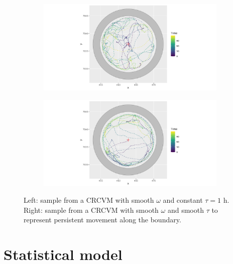 \documentclass[11pt]{article}
\newcommand {\1}{\mathbb{1}}
\theoremstyle{definition}
\theoremstyle{remark}
\theoremstyle{remark}
\begin{document}
 \begin{figure}[H]
 	\centering
 	\begin{subfigure}{0.48\textwidth}
 		\centering
 		\includegraphics[scale=0.4]{images/crcvm/illustrative_sample_circ_standard}
 		\label{fig:illustrativesamplecircstandard}
 	\end{subfigure}
 	\begin{subfigure}{0.48\textwidth}
 		\centering
 		\includegraphics[scale=0.4]{images/crcvm/illustrative_sample_circ_pers}
 		\label{fig:illustrativesamplecircpers}
 	\end{subfigure}
 
 	\caption{Left: sample from a CRCVM with smooth $\omega$ and constant $\tau=1$ h.  Right: sample from a CRCVM with smooth $\omega$ and smooth $\tau$ to represent persistent movement along the boundary.}
 	\label{fig: crcvm examples}
 \end{figure}







\section{Statistical model}
\end{document}
